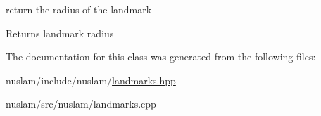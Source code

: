return the radius of the landmark 

\begin{DoxyReturn}{Returns}
landmark radius 
\end{DoxyReturn}


The documentation for this class was generated from the following files\+:\begin{DoxyCompactItemize}
\item 
nuslam/include/nuslam/\hyperlink{landmarks_8hpp}{landmarks.\+hpp}\item 
nuslam/src/nuslam/landmarks.\+cpp\end{DoxyCompactItemize}
